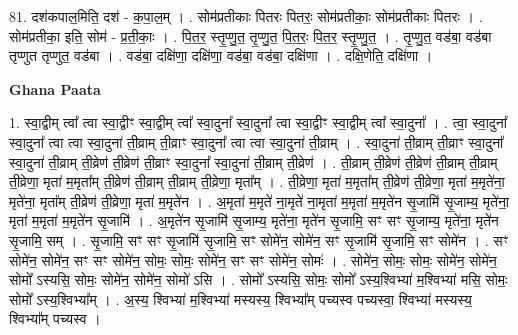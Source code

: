 \documentclass[17pt]{extarticle}
\begin{document}
81. दश॑कपाल॒मिति॒ दश॑ - क॒पा॒ल॒म् । . सोम॑प्रतीकाः पितरः पितरः॒ सोम॑प्रतीकाः॒ सोम॑प्रतीकाः पितरः । . सोम॑प्रतीका॒ इति॒ सोम॑ - प्र॒ती॒काः॒ । . पि॒त॒र॒ स्तृ॒प्णु॒त॒ तृ॒प्णु॒त॒ पि॒त॒रः॒ पि॒त॒र॒ स्तृ॒प्णु॒त॒ । . तृ॒प्णु॒त॒ वड॑बा॒ वड॑बा तृप्णुत तृप्णुत॒ वड॑बा । . वड॑बा॒ दक्षि॑णा॒ दक्षि॑णा॒ वड॑बा॒ वड॑बा॒ दक्षि॑णा । . दक्षि॒णेति॒ दक्षि॑णा । \newline

\textbf{Ghana Paata } \newline

1. स्वा॒द्वीम् त्वा᳚ त्वा स्वा॒द्वीꣳ स्वा॒द्वीम् त्वा᳚ स्वा॒दुना᳚ स्वा॒दुना᳚ त्वा स्वा॒द्वीꣳ स्वा॒द्वीम् त्वा᳚ स्वा॒दुना᳚ । . त्वा॒ स्वा॒दुना᳚ स्वा॒दुना᳚ त्वा त्वा स्वा॒दुना॑ ती॒व्राम् ती॒व्राꣳ स्वा॒दुना᳚ त्वा त्वा स्वा॒दुना॑ ती॒व्राम् । . स्वा॒दुना॑ ती॒व्राम् ती॒व्राꣳ स्वा॒दुना᳚ स्वा॒दुना॑ ती॒व्राम् ती॒व्रेण॑ ती॒व्रेण॑ ती॒व्राꣳ स्वा॒दुना᳚ स्वा॒दुना॑ ती॒व्राम् ती॒व्रेण॑ । . ती॒व्राम् ती॒व्रेण॑ ती॒व्रेण॑ ती॒व्राम् ती॒व्राम् ती॒व्रेणा॒ मृता॑ म॒मृता᳚म् ती॒व्रेण॑ ती॒व्राम् ती॒व्राम् ती॒व्रेणा॒ मृता᳚म् । . ती॒व्रेणा॒ मृता॑ म॒मृता᳚म् ती॒व्रेण॑ ती॒व्रेणा॒ मृता॑ म॒मृते॑ना॒ मृते॑ना॒ मृता᳚म् ती॒व्रेण॑ ती॒व्रेणा॒ मृता॑ म॒मृते॑न । . अ॒मृता॑ म॒मृते॑ ना॒मृते॑ ना॒मृता॑ म॒मृता॑ म॒मृते॑न सृ॒जामि॑ सृ॒जाम्य॒ मृते॑ना॒ मृता॑ म॒मृता॑ म॒मृते॑न सृ॒जामि॑ । . अ॒मृते॑न सृ॒जामि॑ सृ॒जाम्य॒ मृते॑ना॒ मृते॑न सृ॒जामि॒ सꣳ सꣳ सृ॒जाम्य॒ मृते॑ना॒ मृते॑न सृ॒जामि॒ सम् । . सृ॒जामि॒ सꣳ सꣳ सृ॒जामि॑ सृ॒जामि॒ सꣳ सोमे॑न॒ सोमे॑न॒ सꣳ सृ॒जामि॑ सृ॒जामि॒ सꣳ सोमे॑न । . सꣳ सोमे॑न॒ सोमे॑न॒ सꣳ सꣳ सोमे॑न॒ सोमः॒ सोमः॒ सोमे॑न॒ सꣳ सꣳ सोमे॑न॒ सोमः॑ । . सोमे॑न॒ सोमः॒ सोमः॒ सोमे॑न॒ सोमे॑न॒ सोमो᳚ ऽस्यसि॒ सोमः॒ सोमे॑न॒ सोमे॑न॒ सोमो॑ ऽसि । . सोमो᳚ ऽस्यसि॒ सोमः॒ सोमो᳚ ऽस्य॒श्विभ्या॑ म॒श्विभ्या॑ मसि॒ सोमः॒ सोमो᳚ ऽस्य॒श्विभ्या᳚म् । . अ॒स्य॒ श्विभ्या॑ म॒श्विभ्या॑ मस्यस्य॒ श्विभ्या᳚म् पच्यस्व पच्यस्वा॒ श्विभ्या॑ मस्यस्य॒ श्विभ्या᳚म् पच्यस्व । \newline
\end{document}
